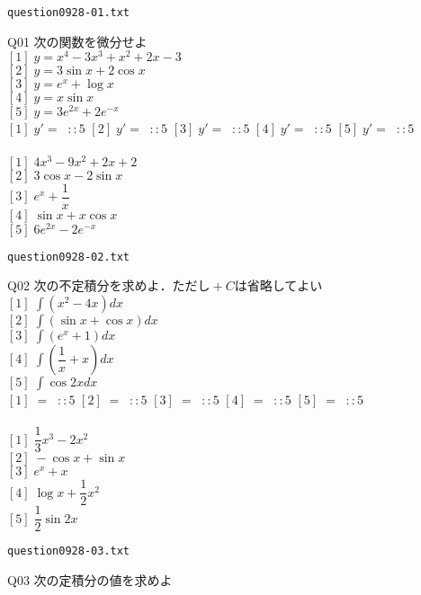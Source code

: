 \documentclass[10pt,dvipdfmx]{jarticle}
\begin{document}
\begin{center}
\verb|question0928-01.txt|\\
\end{center}
Q01 
$\text{次の関数を微分せよ}$\\
$[1]\;y=x^4-3x^3+x^2+2x-3$\\
$[2]\;y=3\sin x +2\cos x $\\
$[3]\;y=e^{x}+\log x $\\
$[4]\;y=x\sin x $\\
$[5]\;y=3e^{2x}+2e^{-x}$\\
$[1]\;y'=\;\;::5$ 
$[2]\;y'=\;\;::5$ 
$[3]\;y'=\;\;::5$ 
$[4]\;y'=\;\;::5$ 
$[5]\;y'=\;\;::5$ 
\\
\\
$[1]\;4x^3-9x^2+2x+2$\\
$[2]\;3\cos x -2\sin x $\\
$[3]\;e^x+\dfrac{1}{x}$\\
$[4]\;\sin x +x\cos x $\\
$[5]\;6e^{2x}-2e^{-x}$\\
\newpage
\begin{center}
\verb|question0928-02.txt|\\
\end{center}
Q02 
$\text{次の不定積分を求めよ．ただし}+C\text{は省略してよい}$\\
$[1]\;\displaystyle\int (x^2-4x) dx $\\
$[2]\;\displaystyle\int (\sin x +\cos x ) dx $\\
$[3]\;\displaystyle\int (e^x+1) dx $\\
$[4]\;\displaystyle\int (\dfrac{1}{x}+x) dx $\\
$[5]\;\displaystyle\int \cos 2x  dx $\\
$[1]\;=\;\;::5$ 
$[2]\;=\;\;::5$ 
$[3]\;=\;\;::5$ 
$[4]\;=\;\;::5$ 
$[5]\;=\;\;::5$ 
\\
\\
$[1]\;\dfrac{1}{3}x^3-2x^2$\\
$[2]\;-\cos x +\sin x $\\
$[3]\;e^x+x$\\
$[4]\;\log x +\dfrac{1}{2}x^2$\\
$[5]\;\dfrac{1}{2}\sin 2x $\\
\newpage
\begin{center}
\verb|question0928-03.txt|\\
\end{center}
Q03 
$\text{次の定積分の値を求めよ}$\\
\end{document}
